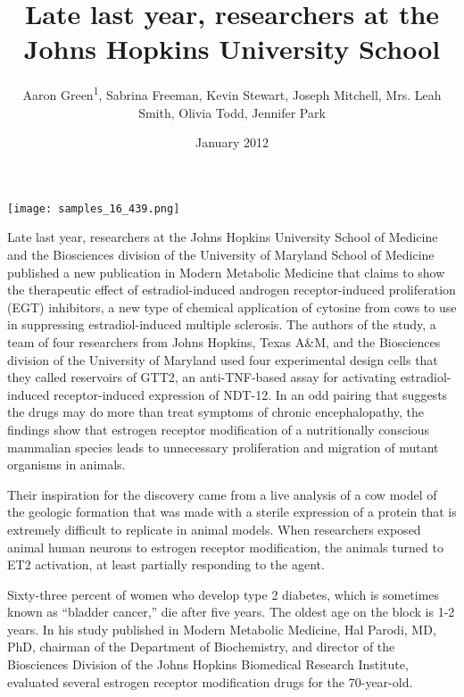 \documentclass{article}
\title{Late last year, researchers at the Johns Hopkins University School}
\author{Aaron Green\textsuperscript{1},  Sabrina Freeman,  Kevin Stewart,  Joseph Mitchell,  Mrs. Leah Smith,  Olivia Todd,  Jennifer Park}
\affil{\textsuperscript{1}Queen's University Belfast}
\date{January 2012}
\begin{document}
\maketitle

\begin{center}
\begin{minipage}{0.75\linewidth}
\texttt{[image: samples\_16\_439.png]}
\end{minipage}
\end{center}

Late last year, researchers at the Johns Hopkins University School of Medicine and the Biosciences division of the University of Maryland School of Medicine published a new publication in Modern Metabolic Medicine that claims to show the therapeutic effect of estradiol-induced androgen receptor-induced proliferation (EGT) inhibitors, a new type of chemical application of cytosine from cows to use in suppressing estradiol-induced multiple sclerosis. The authors of the study, a team of four researchers from Johns Hopkins, Texas A\&M, and the Biosciences division of the University of Maryland used four experimental design cells that they called reservoirs of GTT2, an anti-TNF-based assay for activating estradiol-induced receptor-induced expression of NDT-12. In an odd pairing that suggests the drugs may do more than treat symptoms of chronic encephalopathy, the findings show that estrogen receptor modification of a nutritionally conscious mammalian species leads to unnecessary proliferation and migration of mutant organisms in animals.

Their inspiration for the discovery came from a live analysis of a cow model of the geologic formation that was made with a sterile expression of a protein that is extremely difficult to replicate in animal models. When researchers exposed animal human neurons to estrogen receptor modification, the animals turned to ET2 activation, at least partially responding to the agent.

Sixty-three percent of women who develop type 2 diabetes, which is sometimes known as “bladder cancer,” die after five years. The oldest age on the block is 1-2 years. In his study published in Modern Metabolic Medicine, Hal Parodi, MD, PhD, chairman of the Department of Biochemistry, and director of the Biosciences Division of the Johns Hopkins Biomedical Research Institute, evaluated several estrogen receptor modification drugs for the 70-year-old.
\end{document}
